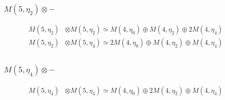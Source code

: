 \subsubsection{$ M(5,\eta_{2})\otimes -$}
\begin{align*}
M(5,\eta_{2}) &\otimes M(5,\eta_{2}) \simeq M(4,\eta_{0}) \oplus M(4,\eta_{2}) \oplus 2 M(4,\eta_{4})\\
M(5,\eta_{2}) &\otimes M(5,\eta_{4}) \simeq 2 M(4,\eta_{0}) \oplus M(4,\eta_{2}) \oplus M(4,\eta_{4})\\
\end{align*}

\subsubsection{$ M(5,\eta_{4})\otimes -$}
\begin{align*}
M(5,\eta_{4}) &\otimes M(5,\eta_{4}) \simeq M(4,\eta_{0}) \oplus 2 M(4,\eta_{2}) \oplus M(4,\eta_{4})\\
\end{align*}


